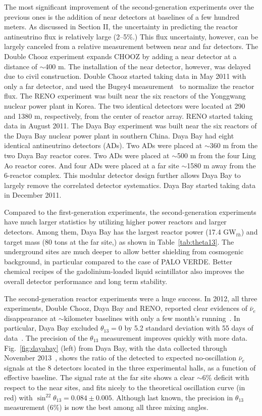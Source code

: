 \documentclass[aps,twocolumn,preprintnumbers,amsmath,superscriptaddress,amssymb,floats,nofootinbib]{revtex4-1}
\begin{document}
The most significant improvement of the second-generation experiments over the previous ones is the addition of near detectors at baselines of a few hundred meters. 
As discussed in Section II, the uncertainty in predicting the reactor antineutrino flux is relatively large (2--5\%.) 
This flux uncertainty, however, can be largely canceled from a relative measurement between near and far detectors. 
The Double Chooz experiment expands CHOOZ by adding a near detector at a distance of $\sim$400 m. 
The installation of the near detector, however, was delayed due to civil construction. 
Double Chooz started taking data in May 2011 with only a far detector, and used the Bugey4 measurement~\cite{Bugey4} to normalize the reactor flux. 
The RENO experiment was built near the six reactors of the Yonggwang nuclear power plant in Korea. 
The two identical detectors were located at 290 and 1380 m, respectively, from the center of reactor array. 
RENO started taking data in August 2011. 
The Daya Bay experiment was built near the six reactors of the Daya Bay nuclear power plant in southern China. 
Daya Bay had eight identical antineutrino detectors (ADs). 
Two ADs were placed at $\sim$360 m from the two  Daya Bay reactor cores. 
Two ADs were placed at $\sim$500 m from the four Ling Ao reactor cores. 
And four ADs were placed at a far site $\sim$1580 m away from the 6-reactor complex. 
This modular detector design further allows Daya Bay to largely remove the correlated detector systematics. 
Daya Bay started taking data in December 2011.

Compared to the first-generation experiments, the second-generation experiments have much larger statistics by utilizing higher power reactors and larger detectors. Among them, Daya Bay has the largest reactor power (17.4 GW$_{th}$) and target mass (80 tons at the far site,) as shown in Table~\ref{tab:theta13}. 
The underground sites are much deeper to allow better shielding from cosmogenic background, in particular compared to the case of PALO VERDE. 
Better chemical recipes of the gadolinium-loaded liquid scintillator also improves the overall detector performance and long term stability.

The second-generation reactor experiments were a huge success. 
In 2012, all three experiments, Double Chooz, Daya Bay and RENO, reported clear evidences of $\bar\nu_{e}$ disappearance at $\sim$kilometer baselines with only a few month's running~\cite{DChooz,Reno,Dayabay}. 
In particular, Daya Bay excluded $\theta_{13}=0$ by 5.2 standard deviation with 55 days of data~\cite{Dayabay}. 
The precision of the $\theta_{13}$ measurement improves quickly with more data.
Fig.~\ref{fig:dayabay} (left) from Daya Bay, with the data collected through November 2013~\cite{Zhang-Neutrino14}, shows the ratio of the detected to expected no-oscillation $\bar\nu_{e}$ signals at the 8 detectors located in the three experimental halls, as a function of effective baseline.
The signal rate at the far site shows a clear $\sim$6\% deficit with respect to the near sites, and fits nicely to the theoretical oscillation curve (in red) with $\sin^22\theta_{13} = 0.084 \pm 0.005$. 
Although last known, the precision in $\theta_{13}$ measurement (6\%) is now the best among all three mixing angles.
\end{document}
